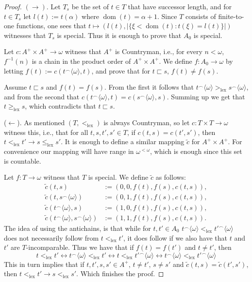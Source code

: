 \documentclass[10pt]{amsart}
\theoremstyle{definition}
\theoremstyle{remark}
\newcommand{\tup}[1]{\langle#1\rangle}
\newcommand{\ra}{\rightarrow}
\newcommand{\lra}{\leftrightarrow}
\newcommand\lex{\mathrm{lex}}
\newcommand{\1}{\mathbbm{1}}
\newcommand{\tle}{\sqsubset}
\DeclareMathOperator{\dom}{dom}
\begin{document}
\begin{proof}
  $(\ra)$. Let $T_{s}$ be the set of $t \in T$ that have successor
  length, and for $t \in T_{s}$ let $l(t) := t(\alpha)$ where
  $\dom(t) = \alpha+1$. Since $T$ consists of finite-to-one functions, one
  sees that $t \mapsto (l(t), |\{\xi < \dom(t) : t(\xi) = l(t)\}|)$
  witnesses that $T_{s}$ is special. Thus it is enough to prove that
  $A_{0}$ is special.

  Let $c : A^{+} \times A^{+} \to \omega$
  witness that $A^{+}$ is Countryman, i.e., for every $n < \omega$,
  $f^{-1}(n)$ is  a chain in the product order of $A^{+} \times A^{+}$.
  We define
  $f : A_{0} \to \omega$ by letting $f(t) := c(t^{\frown}\tup{\omega},t)$,
  and prove that for $t \tle s$, $f(t) \neq f(s)$.

  Assume $t \tle s$ and $f(t) = f(s)$. From the first it follows
  that $t^{\frown}\tup{\omega} >_{\lex} s^{\frown}\tup{\omega}$, and from
  the second that $c(t^{\frown}\tup{\omega},t) = c(s^{\frown}\tup{\omega},s)$. Summing
  up we get that $t \ge_{\lex} s$, which contradicts that $t \tle s$.

  ($\leftarrow$). As mentioned $(T,<_{\lex})$ is always Countryman, so
  let $c  : T \times T \to \omega$ witness this, i.e.,
  that for all $t,s,t',s' \in T$, if $c(t,s) = c(t',s')$, then
  $t <_{\lex} t' \ra s \le_{\lex} s'$. It is enough to define
  a similar mapping $\tilde{c}$ for $A^{+} \times A^{+}$. For convenience
  our mapping will have range in $\omega^{<\omega}$, which is enough since
  this set is countable.

  Let $f : T \to \omega$ witness that $T$ is special.
  We define $\tilde{c}$ as follows:
  \begin{align*}
    \tilde{c}(t,s) &:= (0,0,f(t),f(s),c(t,s)),\\
    \tilde{c}(t,s^{\frown}\tup{\omega}) &:= (0,1,f(t),f(s),c(t,s)),\\
    \tilde{c}(t^{\frown}\tup{\omega},s) &:= (1,0,f(t),f(s),c(t,s)),\\
    \tilde{c}(t^{\frown}\tup{\omega},s^{\frown}\tup{\omega}) &:= (1,1,f(t),f(s),c(t,s)).
  \end{align*}
  The idea of using the antichains, is that while for $t,t' \in A_{0}$
  $t^{\frown}\tup{\omega} <_{\lex} t'^{\frown}\tup{\omega}$
  does not necessarily follow from $t <_{\lex} t'$, it does follow
  if we also have that $t$ and $t'$ are $T$-incomparable. Thus we have
  that if $f(t) = f(t')$ and $t \neq t'$, then
  \[t <_{\lex} t' \lra
    t^{\frown}\tup{\omega} <_{\lex} t' \lra
    t <_{\lex} t'^{\frown}\tup{\omega} \lra
    t^{\frown}\tup{\omega} <_{\lex} t'^{\frown}\tup{\omega}\]
  This in turn implies that
  if $t,t',s,s' \in A^{+}$, $t \neq t'$, $s \neq s'$ and
  $\tilde{c}(t,s) = \tilde{c}(t',s')$, then
  $t <_{\lex} t' \ra s <_{\lex} s'$. Which finishes the proof.
\end{proof}
\end{document}
